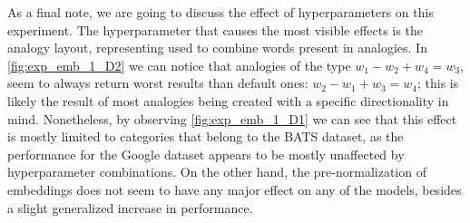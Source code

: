 As a final note, we are going to discuss the effect of hyperparameters on this experiment.
The hyperparameter that causes the most visible effects is the analogy layout, representing  used to combine words present in analogies.
In \cref{fig:exp_emb_1_D2} we can notice that analogies of the type $w_1 - w_2 + w_4 = w_3$, seem to always return worst results than default ones: $w_2 - w_1 + w_3 = w_4$; this is likely the result of most analogies being created with a specific directionality in mind.
Nonetheless, by observing \cref{fig:exp_emb_1_D1} we can see that this effect is mostly limited to categories that belong to the BATS dataset, as the performance for the Google dataset appears to be mostly unaffected by hyperparameter combinations.
On the other hand, the pre-normalization of embeddings does not seem to have any major effect on any of the models, besides a slight generalized increase in performance.

\begin{figure}[t!]
    \centering
    \quad
    \caption{}
    \label{fig:exp_emb_1_D}
\end{figure}

